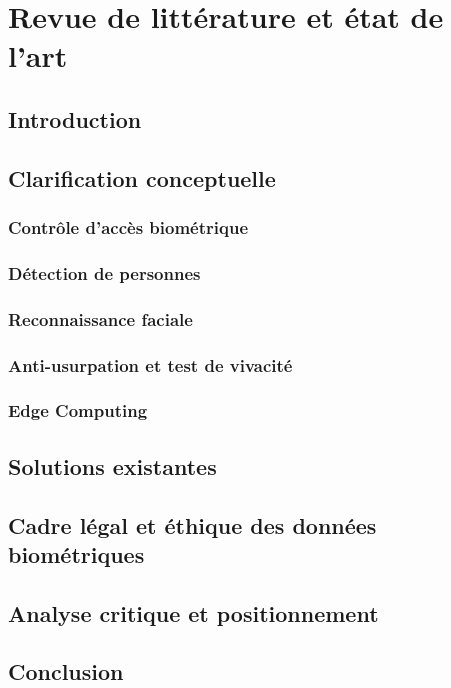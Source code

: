 \chapter{Revue de littérature et état de l'art}

\section*{Introduction}
\aredigerr %

\section{Clarification conceptuelle}
\subsection{Contrôle d'accès biométrique}\aredigerr
\subsection{Détection de personnes}\aredigerr
\subsection{Reconnaissance faciale}\aredigerr
\subsection{Anti-usurpation et test de vivacité}\aredigerr
\subsection{Edge Computing}\aredigerr

\section{Solutions existantes}
\aredigerr

\section{Cadre légal et éthique des données biométriques}
\aredigerr

\section{Analyse critique et positionnement}
\aredigerr

\section*{Conclusion}
\aredigerr %
